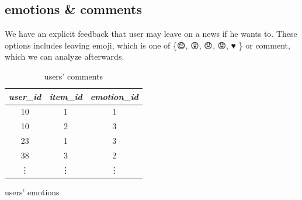 \documentclass{article}
\begin{document}
\subsection*{emotions \& comments}

We have an explicit feedback that user may leave on a news if he wants to. These options includes leaving emoji, which is one of \{{\DejaSans 😄, 😲, 😞, 😡, ♥ }\} or comment, which we can analyze afterwards.

\begin{table}[h]
    \parbox{.45\textwidth}{
        \centering
        \begin{tabular}{ccc}
            \toprule

            \emph{user\_id} & \emph{item\_id} & \emph{emotion\_id} \\\midrule
            10 & 1 & 1  \\
            10 & 2 & 3        \\
            23 & 1 & 3        \\
            38 & 3 & 2        \\
            \vdots & \vdots & \vdots  \\\bottomrule

        \end{tabular}
        \caption{users' emotions}
        \label{tab:emotion}
    }
    \hfill
    \parbox{.45\textwidth}{
        \centering
        \caption{users' comments}
        \label{tab:comment}
        }
\end{table}   

\end{document}
